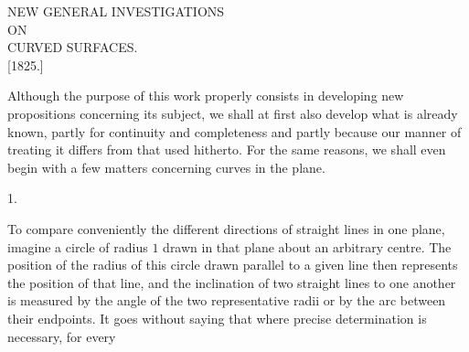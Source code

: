 \clearpage
{}%
\begin{center}\large NEW GENERAL INVESTIGATIONS\\[4pt] ON\\[4pt] CURVED SURFACES.\\[7pt] [1825.]\end{center}
\noindent\hspace*{1.2em}Although the purpose of this work properly consists in developing new propositions concerning its subject, we shall at first also develop what is already known, partly for continuity and completeness and partly because our manner of treating it differs from that used hitherto. For the same reasons, we shall even begin with a few matters concerning curves in the plane.

\begin{center}1.\end{center}
\noindent\hspace*{1.2em}To compare conveniently the different directions of straight lines in one plane, imagine a circle of radius $1$ drawn in that plane about an arbitrary centre. The position of the radius of this circle drawn parallel to a given line then represents the position of that line, and the inclination of two straight lines to one another is measured by the angle of the two representative radii or by the arc between their endpoints. It goes without saying that where precise determination is necessary, for every\space%
